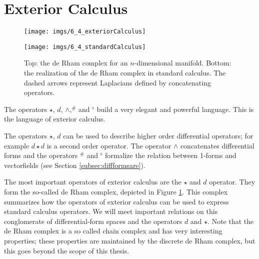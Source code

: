 \section{Exterior Calculus}
\label{sec:EC_EC}

\begin{figure}[t]
\begin{center}
\texttt{[image: imgs/6\_4\_exteriorCalculus]}

\texttt{[image: imgs/6\_4\_standardCalculus]}
\end{center}
\caption{Top: the de Rham complex for an $n$-dimensional manifold. Bottom: the realization of the de Rham complex in standard calculus.  The dashed arrows represent Laplacians defined by concatenating operators.}
\label{fig::deRhamComplex}
\end{figure}

The operators $\star$, $d$, $\wedge$,$^\#$ and $^\flat$ build a very elegant and powerful language. This is the language of exterior calculus. 

The operators $\star$, $d$ can be used to describe higher order differential operators; for example $d\star d$ is a second order operator.
The operator $\wedge$ concatenates differential forms and the operators $^\#$ and $^\flat$ formalize the relation between 1-forms and vectorfields (see Section \ref{subsec:diffformsare}).

The most important operators of exterior calculus are the $\star$ and $d$ operator. They form the so-called de Rham complex, depicted in Figure \ref{fig::deRhamComplex}. 
This complex summarizes how the operators of exterior calculus can be used to express standard calculus operators. We will meet important relations on this conglomerate of differential-form spaces and the operators $d$ and $\star$.
Note that the de Rham complex is a so called chain complex and has very interesting properties; these properties are maintained by the discrete de Rham complex, but this goes beyond the scope of this thesis. %

